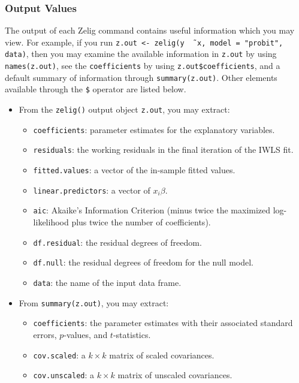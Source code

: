 \subsubsection{Output Values}

The output of each Zelig command contains useful information which you
may view.  For example, if you run \texttt{z.out <- zelig(y \~\,
  x, model = "probit", data)}, then you may examine the available
information in \texttt{z.out} by using \texttt{names(z.out)},
see the {\tt coefficients} by using {\tt z.out\$coefficients}, and
a default summary of information through \texttt{summary(z.out)}.
Other elements available through the {\tt \$} operator are listed
below.

\begin{itemize}
\item From the {\tt zelig()} output object {\tt z.out}, you may extract:
   \begin{itemize}
   \item {\tt coefficients}: parameter estimates for the explanatory
     variables.
   \item {\tt residuals}: the working residuals in the final iteration
     of the IWLS fit.
   \item {\tt fitted.values}: a vector of the in-sample fitted values.
   \item {\tt linear.predictors}: a vector of $x_{i}\beta$.  
   \item {\tt aic}: Akaike's Information Criterion (minus twice the
     maximized log-likelihood plus twice the number of coefficients).
   \item {\tt df.residual}: the residual degrees of freedom.
   \item {\tt df.null}: the residual degrees of freedom for the null
     model.
   \item {\tt data}: the name of the input data frame.  
   \end{itemize}

\item From {\tt summary(z.out)}, you may extract: 
   \begin{itemize}
   \item {\tt coefficients}: the parameter estimates with their
     associated standard errors, $p$-values, and $t$-statistics.
   \item{\tt cov.scaled}: a $k \times k$ matrix of scaled covariances.
   \item{\tt cov.unscaled}: a $k \times k$ matrix of unscaled
     covariances.  
   \end{itemize}


\end{itemize}

